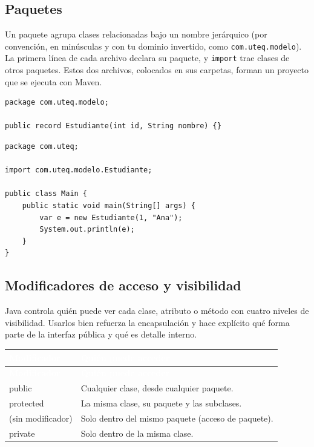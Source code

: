 \documentclass[11pt]{article}
\begin{document}
\subsection{Paquetes}
Un paquete agrupa clases relacionadas bajo un nombre jerárquico (por convención, en minúsculas y con tu dominio invertido, como \texttt{com.\allowbreak{}uteq.\allowbreak{}modelo}). La primera línea de cada archivo declara su paquete, y \texttt{import} trae clases de otros paquetes. Estos dos archivos, colocados en sus carpetas, forman un proyecto que se ejecuta con Maven.

\begin{cajacodigo}
\begin{lstlisting}[style=java]
package com.uteq.modelo;

public record Estudiante(int id, String nombre) {}
\end{lstlisting}
\end{cajacodigo}
\vspace{2pt}
\begin{cajacodigo}
\begin{lstlisting}[style=java]
package com.uteq;

import com.uteq.modelo.Estudiante;

public class Main {
    public static void main(String[] args) {
        var e = new Estudiante(1, "Ana");
        System.out.println(e);
    }
}
\end{lstlisting}
\end{cajacodigo}
\vspace{2pt}
\subsection{Modificadores de acceso y visibilidad}
Java controla quién puede ver cada clase, atributo o método con cuatro niveles de visibilidad. Usarlos bien refuerza la encapsulación y hace explícito qué forma parte de la interfaz pública y qué es detalle interno.

{\renewcommand{\arraystretch}{1.25}
\begin{longtable}{>{\raggedright\arraybackslash}p{3.4cm} >{\raggedright\arraybackslash}p{12cm}}
\rowcolor{javaazul}\textcolor{white}{\textbf{Modificador}} & \textcolor{white}{\textbf{Quién puede acceder}} \\
\endfirsthead
\rowcolor{javaazul}\textcolor{white}{\textbf{Modificador}} & \textcolor{white}{\textbf{Quién puede acceder}} \\
\endhead
\ttfamily\color{javaazul}public & Cualquier clase, desde cualquier paquete. \\ \hline
\ttfamily\color{javaazul}protected & La misma clase, su paquete y las subclases. \\ \hline
\ttfamily\color{javaazul}(sin modificador) & Solo dentro del mismo paquete (acceso de paquete). \\ \hline
\ttfamily\color{javaazul}private & Solo dentro de la misma clase. \\ \hline
\end{longtable}}
\end{document}
